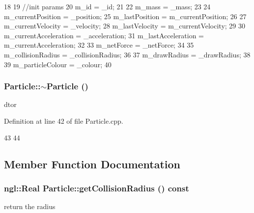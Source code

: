 \begin{DoxyCode}
18 {
19     //init params
20     m_id = _id;
21 
22     m_mass = _mass;
23 
24     m_currentPosition = _position;
25     m_lastPosition = m_currentPosition;
26 
27     m_currentVelocity = _velocity;
28     m_lastVelocity = m_currentVelocity;
29 
30     m_currentAcceleration = _acceleration;
31     m_lastAcceleration = m_currentAcceleration;
32 
33     m_netForce = _netForce;
34 
35     m_collisionRadius = _collisionRadius;
36 
37     m_drawRadius = _drawRadius;
38 
39     m_particleColour = _colour;
40 }
\end{DoxyCode}


\hypertarget{class_particle_ad030d0fe7b88cf81744b127c99244ff4}{
\subsubsection[{$\sim$Particle}]{\setlength{\rightskip}{0pt plus 5cm}Particle::$\sim$Particle ()}}
\label{class_particle_ad030d0fe7b88cf81744b127c99244ff4}


dtor 



Definition at line 42 of file Particle.cpp.




\begin{DoxyCode}
43 {
44 }
\end{DoxyCode}




\subsection{Member Function Documentation}
\hypertarget{class_particle_aa036d0b56d97a9f56d9c5e3ab9035b9d}{
\subsubsection[{getCollisionRadius}]{\setlength{\rightskip}{0pt plus 5cm}ngl::Real Particle::getCollisionRadius () const}}
\label{class_particle_aa036d0b56d97a9f56d9c5e3ab9035b9d}


return the radius 



